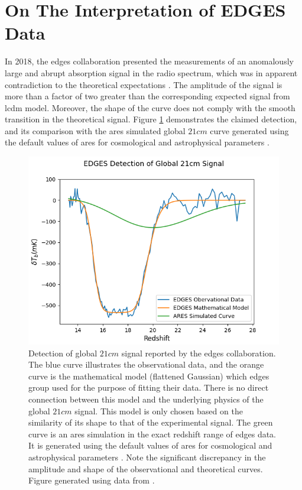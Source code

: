 \documentclass[12pt, TexShade, letterpaper]{report}
\begin{document}
\section{On The Interpretation of EDGES Data}
\label{chap:Observations,sub:edges_affair}
 In 2018, the \gls{edges} collaboration presented the measurements of an anomalously large and abrupt absorption signal in the radio spectrum, which was in apparent contradiction to the theoretical expectations \cite{edges}. The amplitude of the signal is more than a factor of two greater than the corresponding expected signal from \gls{lcdm} model. Moreover, the shape of the curve does not comply with the smooth transition in the theoretical signal. Figure \ref{fig:edges_data} demonstrates the claimed detection, and its comparison with the \gls{ares} simulated global $21cm$ curve generated using the default values of \gls{ares} for cosmological and astrophysical parameters \cite{ares_documentation}.\par
\begin{figure}[h!]
    \centering
    \includegraphics[scale= 0.8]{edges_data.png}
    \caption[Results of \gls{edges} Experiment]{Detection of global $21cm$ signal reported by the \gls{edges} collaboration. The blue curve illustrates the observational data, and the orange curve is the mathematical model (flattened Gaussian) which \gls{edges} group used for the purpose of fitting their data. There is no direct connection between this model and the underlying physics of the global $21cm$ signal. This model is only chosen based on the similarity of its shape to that of the experimental signal. The green curve is an \gls{ares} simulation in the exact redshift range of \gls{edges} data. It is generated using the default values of \gls{ares} for cosmological and astrophysical parameters \cite{ares_documentation}. Note the significant discrepancy in the amplitude and shape of the observational and theoretical curves. Figure generated using data from \cite{edges}.}
    \label{fig:edges_data}
\end{figure}
 
\end{document}
